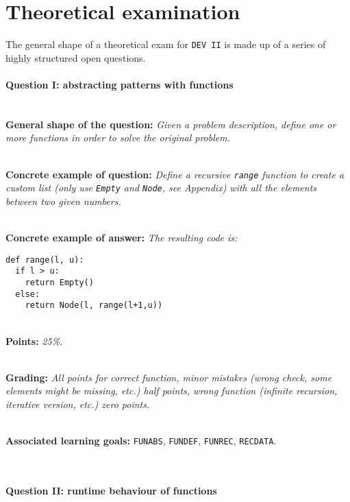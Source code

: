 \section*{Theoretical examination \modulecode}
The general shape of a theoretical exam for \texttt{DEV II} is made up of a series of highly structured open questions.


\paragraph{Question I: abstracting patterns with functions} \ \\

\textbf{General shape of the question:} \textit{Given a problem description, define one or more functions in order to solve the original problem.}

\ \\ 

\textbf{Concrete example of question:} \textit{Define a recursive \texttt{range} function to create a custom list (only use \texttt{Empty} and \texttt{Node}, see Appendix) with all the elements between two given numbers.}

\ \\ 

\textbf{Concrete example of answer:} \textit{The resulting code is:}

\begin{lstlisting}
def range(l, u):
  if l > u:
    return Empty()
  else:
    return Node(l, range(l+1,u))
\end{lstlisting}

\ \\ 

\textbf{Points:} \textit{25\%.}

\ \\ 

\textbf{Grading:} \textit{All points for correct function, minor mistakes (wrong check, some elements might be missing, etc.) half points, wrong function (infinite recursion, iterative version, etc.) zero points.}

\ \\ 

\textbf{Associated learning goals:} \texttt{FUNABS}, \texttt{FUNDEF}, \texttt{FUNREC}, \texttt{RECDATA}.

\ \\ 

\paragraph{Question II: runtime behaviour of functions} \ \\

